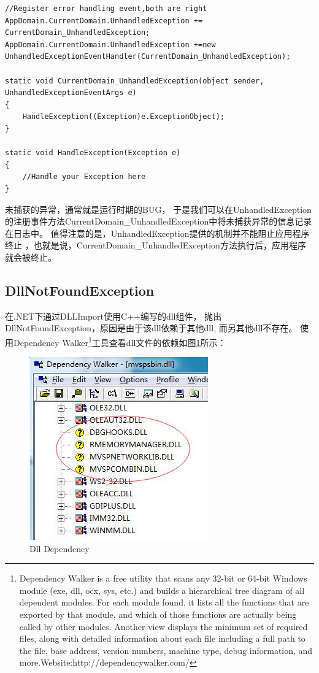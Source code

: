\documentclass{book}
\begin{document}
\begin{lstlisting}[language={[Sharp]C}]
//Register error handling event,both are right
AppDomain.CurrentDomain.UnhandledException += CurrentDomain_UnhandledException;
AppDomain.CurrentDomain.UnhandledException +=new UnhandledExceptionEventHandler(CurrentDomain_UnhandledException);

static void CurrentDomain_UnhandledException(object sender, UnhandledExceptionEventArgs e)
{
    HandleException((Exception)e.ExceptionObject);
}

static void HandleException(Exception e)
{
    //Handle your Exception here
}
\end{lstlisting}

未捕获的异常，通常就是运行时期的BUG，
于是我们可以在UnhandledException 的注册事件方法CurrentDomain\_UnhandledException中将未捕获异常的信息记录在日志中。
值得注意的是，UnhandledException提供的机制并不能阻止应用程序终止
，也就是说，CurrentDomain\_UnhandledException方法执行后，应用程序就会被终止。

\subsection{DllNotFoundException}

在.NET下通过DLLImport使用C++编写的dll组件，
抛出DllNotFoundException，原因是由于该dll依赖于其他dll, 而另其他dll不存在。
使用Dependency Walker\footnote{Dependency Walker is a free utility that scans any 32-bit or 64-bit Windows module (exe, dll, ocx, sys, etc.) 
and builds a hierarchical tree diagram of all dependent modules. 
For each module found, it lists all the functions that are exported by that module, 
and which of those functions are actually being called by other modules. Another view displays the minimum set of required files, 
along with detailed information about each file including a full path to the file, base address, 
version numbers, machine type, debug information, and more.Website:http://dependencywalker.com/}工具查看dll文件的依赖如图\ref{fig:AnalyseDllDependency}所示：

\begin{figure}[htbp]
	\centering
	\includegraphics[scale=0.6]{AnalyseDllDependency.jpg}
	\caption{Dll Dependency}
	\label{fig:AnalyseDllDependency}
\end{figure}
\end{document}
